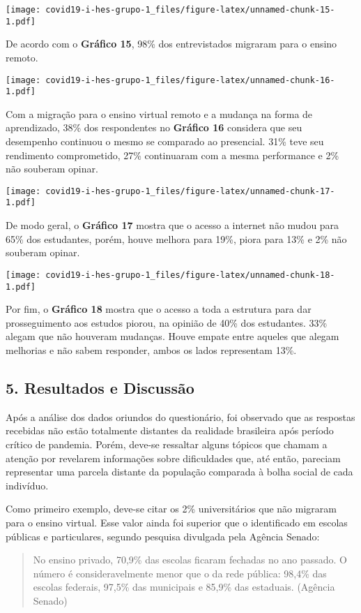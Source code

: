 \documentclass[
]{article}
\begin{document}
\texttt{[image: covid19-i-hes-grupo-1\_files/figure-latex/unnamed-chunk-15-1.pdf]}

De acordo com o \textbf{Gráfico 15}, 98\% dos entrevistados migraram
para o ensino remoto.

\texttt{[image: covid19-i-hes-grupo-1\_files/figure-latex/unnamed-chunk-16-1.pdf]}

Com a migração para o ensino virtual remoto e a mudança na forma de
aprendizado, 38\% dos respondentes no \textbf{Gráfico 16} considera que
seu desempenho continuou o mesmo se comparado ao presencial. 31\% teve
seu rendimento comprometido, 27\% continuaram com a mesma performance e
2\% não souberam opinar.

\texttt{[image: covid19-i-hes-grupo-1\_files/figure-latex/unnamed-chunk-17-1.pdf]}

De modo geral, o \textbf{Gráfico 17} mostra que o acesso a internet não
mudou para 65\% dos estudantes, porém, houve melhora para 19\%, piora
para 13\% e 2\% não souberam opinar.

\texttt{[image: covid19-i-hes-grupo-1\_files/figure-latex/unnamed-chunk-18-1.pdf]}

Por fim, o \textbf{Gráfico 18} mostra que o acesso a toda a estrutura
para dar prosseguimento aos estudos piorou, na opinião de 40\% dos
estudantes. 33\% alegam que não houveram mudanças. Houve empate entre
aqueles que alegam melhorias e não sabem responder, ambos os lados
representam 13\%.

\hypertarget{resultados-e-discussuxe3o}{%
\subsection{5. Resultados e Discussão}\label{resultados-e-discussuxe3o}}

Após a análise dos dados oriundos do questionário, foi observado que as
respostas recebidas não estão totalmente distantes da realidade
brasileira após período crítico de pandemia. Porém, deve-se ressaltar
alguns tópicos que chamam a atenção por revelarem informações sobre
dificuldades que, até então, pareciam representar uma parcela distante
da população comparada à bolha social de cada indivíduo.

Como primeiro exemplo, deve-se citar os 2\% universitários que não
migraram para o ensino virtual. Esse valor ainda foi superior que o
identificado em escolas públicas e particulares, segundo pesquisa
divulgada pela Agência Senado:

\begin{quote}
No ensino privado, 70,9\% das escolas ficaram fechadas no ano passado. O
número é consideravelmente menor que o da rede pública: 98,4\% das
escolas federais, 97,5\% das municipais e 85,9\% das estaduais. (Agência
Senado)
\end{quote}
\end{document}

